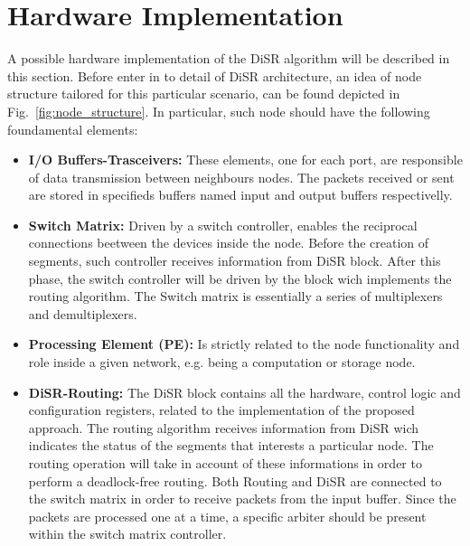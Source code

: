 \section{Hardware Implementation}
\label{sec:implementation}

A possible hardware implementation of the DiSR algorithm will be
described in this section.  Before enter in to detail of  DiSR
architecture,  an idea of node structure tailored for this particular
scenario, can be found depicted in Fig.~\ref{fig:node_structure}. In
particular, such node should have the following foundamental elements:

\begin{itemize}%

\item \textbf{I/O Buffers-Trasceivers:} These elements, one for
each port,  are responsible of data transmission between neighbours
nodes. The packets received or sent are stored in specifieds buffers
named input and output buffers respectivelly.

\item \textbf{Switch Matrix:} Driven by a switch controller, enables the
reciprocal connections beetween the devices inside the node. Before
the creation of segments, such controller receives information from
DiSR block.  After this phase, the switch controller will be driven by
the block wich implements the routing algorithm. The Switch matrix is
essentially a series of multiplexers and demultiplexers.

\item  \textbf{Processing Element (PE):} Is strictly related to the node
functionality  and role inside a given network, e.g. being a
computation or storage node.

\item \textbf{DiSR-Routing:} The DiSR block contains all the hardware, control
logic and configuration registers, related to the implementation of the
proposed approach. The routing algorithm receives information
from DiSR  wich indicates the status of the segments that interests a
particular node. The routing operation will take in account of these
informations in order to perform a deadlock-free routing. Both Routing
and DiSR are connected to the switch matrix in order to receive
packets from the input buffer. Since the packets are processed one at
a time, a specific arbiter should be present within the switch matrix
controller. 

\end{itemize}%

